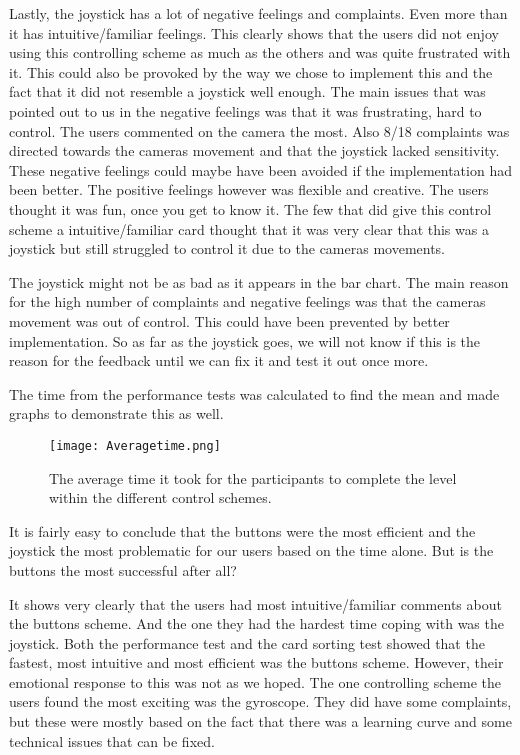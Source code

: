 Lastly, the joystick has a lot of negative feelings and complaints. Even more than it has intuitive/familiar feelings. This clearly shows that the users did not enjoy using this controlling scheme as much as the others and was quite frustrated with it. This could also be provoked by the way we chose to implement this and the fact that it did not resemble a joystick well enough. The main issues that was pointed out to us in the negative feelings was that it was frustrating, hard to control. The users commented on the camera the most. Also 8/18 complaints was directed towards the cameras movement and that the joystick lacked sensitivity. These negative feelings could maybe have been avoided if the implementation had been better. %
The positive feelings however was flexible and creative. The users thought it was fun, once you get to know it. 
The few that did give this control scheme a intuitive/familiar card thought that it was very clear that this was a joystick but still struggled to control it due to the cameras movements.

The joystick might not be as bad as it appears in the bar chart. The main reason for the high number of complaints and negative feelings was that the cameras movement was out of control. This could have been prevented by better implementation. So as far as the joystick goes, we will not know if this is the reason for the feedback until we can fix it and test it out once more.


The time from the performance tests was calculated to find the mean and made graphs to demonstrate this as well. 

\begin{figure}[H]
\centering
\texttt{[image: Averagetime.png]}
\caption{The average time it took for the participants to complete the level within the different control schemes.}
\end{figure}

It is fairly easy to conclude that the buttons were the most efficient and the joystick the most problematic for our users based on the time alone. But is the buttons the most successful after all?

It shows very clearly that the users had most intuitive/familiar comments about the buttons scheme. And the one they had the hardest time coping with was the joystick. 
Both the performance test and the card sorting test showed that the fastest, most intuitive and most efficient was the buttons scheme. However, their emotional response to this was not as we hoped. 
The one controlling scheme the users found the most exciting was the gyroscope. They did have some complaints, but these were mostly based on the fact that there was a learning curve and some technical issues that can be fixed. 

